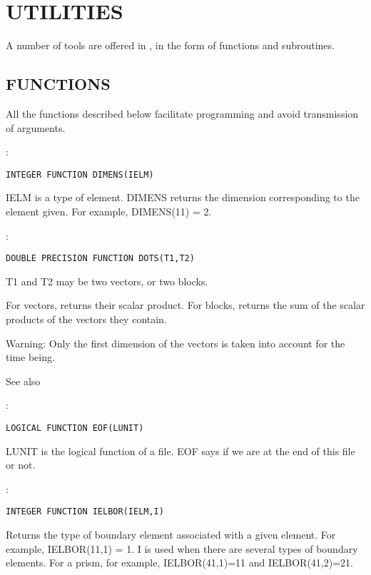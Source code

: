 \section{UTILITIES}

A number of tools are offered in \bief, in the form of functions and subroutines.

\subsection{FUNCTIONS}

All the functions described below facilitate programming and avoid transmission of arguments.

:
\begin{lstlisting}[language=TelFortran]
INTEGER FUNCTION DIMENS(IELM)
\end{lstlisting}

IELM is a type of element. DIMENS returns the dimension corresponding to the
element given. For example, DIMENS(11) = 2.

:
\begin{lstlisting}[language=TelFortran]
DOUBLE PRECISION FUNCTION DOTS(T1,T2)
\end{lstlisting}

T1 and T2 may be two vectors, or two blocks.

For vectors, returns their scalar product. For blocks, returns the sum of the
scalar products of the vectors they contain.

\begin{WarningBlock}{Warning:}
Only the first dimension of the vectors is taken into account for the time being.
\end{WarningBlock}

See also 

:
\begin{lstlisting}[language=TelFortran]
LOGICAL FUNCTION EOF(LUNIT)
\end{lstlisting}

LUNIT is the logical function of a file. EOF says if we are at the end of this
file or not.

:
\begin{lstlisting}[language=TelFortran]
INTEGER FUNCTION IELBOR(IELM,I)
\end{lstlisting}

Returns the type of boundary element associated with a given element. For
example, IELBOR(11,1) = 1. I is used when there are several types of boundary
elements. For a prism, for example, IELBOR(41,1)=11 and IELBOR(41,2)=21.

